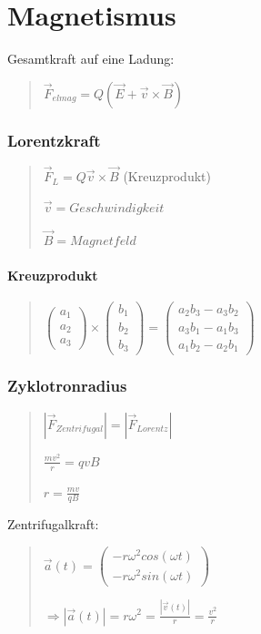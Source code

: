 
\part*{Magnetismus}

Gesamtkraft auf eine Ladung:
\begin{verse}
$\vec{F}_{elmag}=Q(\vec{E}+\vec{v}\times\vec{B})$
\end{verse}

\section*{Lorentzkraft}
\begin{verse}
$\vec{F}_{L}=Q\vec{v}\times\vec{B}$ (Kreuzprodukt)

$\vec{v}=Geschwindigkeit$

$\vec{B}=Magnetfeld$
\end{verse}

\subsection*{Kreuzprodukt}
\begin{verse}
$\left(\begin{array}{c}
a_{1}\\
a_{2}\\
a_{3}
\end{array}\right)\times\left(\begin{array}{c}
b_{1}\\
b_{2}\\
b_{3}
\end{array}\right)=\left(\begin{array}{c}
a_{2}b_{3}-a_{3}b_{2}\\
a_{3}b_{1}-a_{1}b_{3}\\
a_{1}b_{2}-a_{2}b_{1}
\end{array}\right)$
\end{verse}

\section*{Zyklotronradius}
\begin{verse}
$|\vec{F}_{Zentrifugal}|=|\vec{F}_{Lorentz}|$

$\frac{mv^{2}}{r}=qvB$

$r=\frac{mv}{qB}$
\end{verse}
Zentrifugalkraft:
\begin{verse}
$\vec{a}(t)=\left(\begin{array}{c}
-r\omega^{2}cos(\omega t)\\
-r\omega^{2}sin(\omega t)
\end{array}\right)$

$\Rightarrow|\vec{a}(t)|=r\omega^{2}=\frac{|\vec{v}(t)|}{r}=\frac{v^{2}}{r}$
\end{verse}

